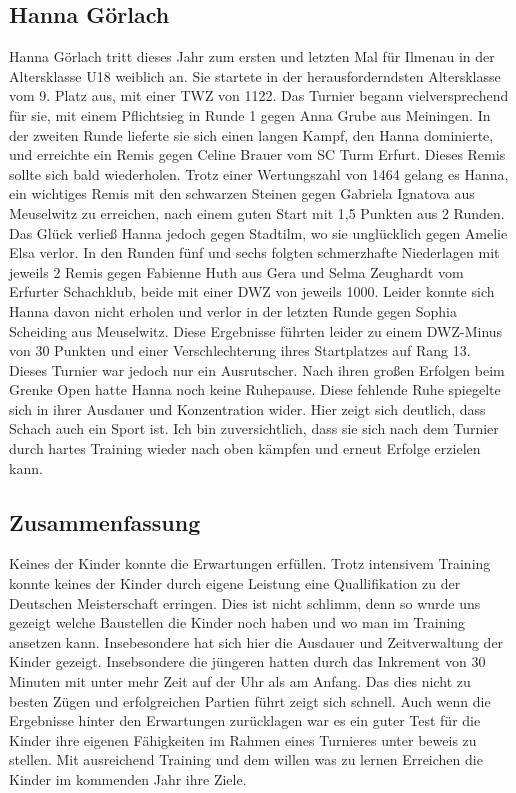 \documentclass[a4paper,ngerman]{tui-algo-seminar}
\begin{document}
\subsection{Hanna Görlach}
Hanna Görlach tritt dieses Jahr zum ersten und letzten Mal für Ilmenau in der Altersklasse U18 weiblich an. Sie startete in der herausforderndsten Altersklasse vom 9. Platz aus, mit einer TWZ von 1122. Das Turnier begann vielversprechend für sie, mit einem Pflichtsieg in Runde 1 gegen Anna Grube aus Meiningen. In der zweiten Runde lieferte sie sich einen langen Kampf, den Hanna dominierte, und erreichte ein Remis gegen Celine Brauer vom SC Turm Erfurt. Dieses Remis sollte sich bald wiederholen. Trotz einer Wertungszahl von 1464 gelang es Hanna, ein wichtiges Remis mit den schwarzen Steinen gegen Gabriela Ignatova aus Meuselwitz zu erreichen, nach einem guten Start mit 1,5 Punkten aus 2 Runden.
Das Glück verließ Hanna jedoch gegen Stadtilm, wo sie unglücklich gegen Amelie Elsa verlor. In den Runden fünf und sechs folgten schmerzhafte Niederlagen mit jeweils 2 Remis gegen Fabienne Huth aus Gera und Selma Zeughardt vom Erfurter Schachklub, beide mit einer DWZ von jeweils 1000. Leider konnte sich Hanna davon nicht erholen und verlor in der letzten Runde gegen Sophia Scheiding aus Meuselwitz. Diese Ergebnisse führten leider zu einem DWZ-Minus von 30 Punkten und einer Verschlechterung ihres Startplatzes auf Rang 13.
Dieses Turnier war jedoch nur ein Ausrutscher. Nach ihren großen Erfolgen beim Grenke Open hatte Hanna noch keine Ruhepause. Diese fehlende Ruhe spiegelte sich in ihrer Ausdauer und Konzentration wider. Hier zeigt sich deutlich, dass Schach auch ein Sport ist.
Ich bin zuversichtlich, dass sie sich nach dem Turnier durch hartes Training wieder nach oben kämpfen und erneut Erfolge erzielen kann.


\subsection{Zusammenfassung}
Keines der Kinder konnte die Erwartungen erfüllen. Trotz intensivem Training konnte keines der Kinder durch eigene Leistung eine Quallifikation zu der Deutschen Meisterschaft erringen. Dies ist nicht schlimm, denn so wurde uns gezeigt welche Baustellen die Kinder noch haben und wo man im Training ansetzen kann. Insebesondere hat sich hier die Ausdauer und Zeitverwaltung der Kinder gezeigt. Insebsondere die jüngeren hatten durch das Inkrement von 30 Minuten mit unter mehr Zeit auf der Uhr als am Anfang. Das dies nicht zu besten Zügen und erfolgreichen Partien führt zeigt sich schnell.  Auch wenn die Ergebnisse hinter den Erwartungen zurücklagen war es ein guter Test für die Kinder ihre eigenen Fähigkeiten im Rahmen eines Turnieres unter beweis zu stellen. Mit ausreichend Training und dem willen was zu lernen Erreichen die Kinder im kommenden Jahr ihre Ziele. 
\end{document}
